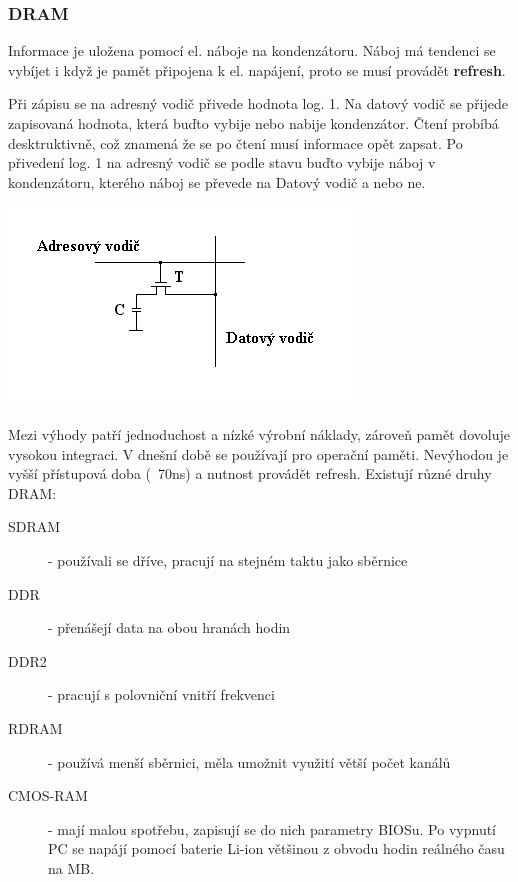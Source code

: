 \subsubsection{DRAM}
Informace je uložena pomocí el. náboje na kondenzátoru.
Náboj má tendenci se vybíjet i když je pamět připojena k el. napájení, proto se musí provádět \textbf{refresh}.
\begin{multicols}{2}
    Při zápisu se na adresný vodič přivede hodnota log. 1.
    Na datový vodič se přijede zapisovaná hodnota, která buďto vybije nebo nabije kondenzátor.
    Čtení probíbá desktruktivně, což znamená že se po čtení musí informace opět zapsat.
    Po přivedení log. 1 na adresný vodič se podle stavu buďto vybije náboj v kondenzátoru, kterého náboj se převede na Datový vodič a nebo ne.\\
    \columnbreak

    \includegraphics[width=0.8\linewidth]{TVY-POS/Polovodicove-pameti/DRAM.png}
\end{multicols}
Mezi výhody patří jednoduchost a nízké výrobní náklady, zároveň pamět dovoluje vysokou integraci.
V dnešní době se používají pro operační paměti.
Nevýhodou je vyšší přístupová doba (~70ns) a nutnost provádět refresh.
Existují různé druhy DRAM:
\begin{description}
    \item[SDRAM]- používali se dříve, pracují na stejném taktu jako sběrnice
    \item[DDR]- přenášejí data na obou hranách hodin
    \item[DDR2]- pracují s polovniční vnitří frekvenci
    \item[RDRAM]- používá menší sběrnici, měla umožnit využití větší počet kanálů
    \item[CMOS-RAM]- mají malou spotřebu, zapisují se do nich parametry BIOSu. Po vypnutí PC se napájí pomocí baterie Li-ion většinou z obvodu hodin reálného času na MB.
\end{description}
